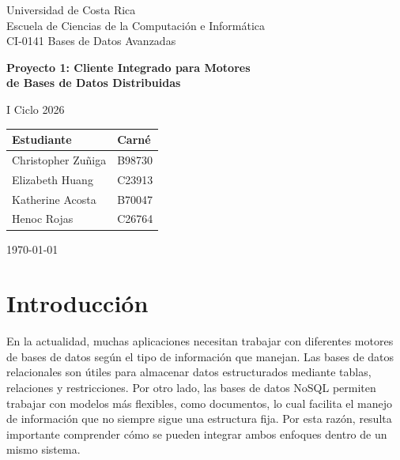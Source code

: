\documentclass[12pt,letterpaper]{article}
\begin{document}
\begin{titlepage}
  \centering
  \vspace*{1cm}

  {\large Universidad de Costa Rica\\
   Escuela de Ciencias de la Computación e Informática\\
   CI-0141 Bases de Datos Avanzadas}

  \vspace{2cm}

  {\LARGE\bfseries Proyecto 1: Cliente Integrado para Motores\\
   de Bases de Datos Distribuidas}

  \vspace{1.5cm}

  {\large I Ciclo 2026}

  \vspace{2cm}

  \begin{tabular}{ll}
    \toprule
    \textbf{Estudiante} & \textbf{Carné} \\
    \midrule
    Christopher Zuñiga & B98730 \\
    Elizabeth Huang & C23913 \\
    Katherine Acosta & B70047 \\
    Henoc Rojas & C26764 \\
    \bottomrule
  \end{tabular}

  \vfill

  {\large \today}
\end{titlepage}

\tableofcontents
\newpage

\section{Introducción}

En la actualidad, muchas aplicaciones necesitan trabajar con diferentes motores de bases de datos según el tipo de información que manejan. Las bases de datos relacionales son útiles para almacenar datos estructurados mediante tablas, relaciones y restricciones. Por otro lado, las bases de datos NoSQL permiten trabajar con modelos más flexibles, como documentos, lo cual facilita el manejo de información que no siempre sigue una estructura fija. Por esta razón, resulta importante comprender cómo se pueden integrar ambos enfoques dentro de un mismo sistema.
\end{document}

